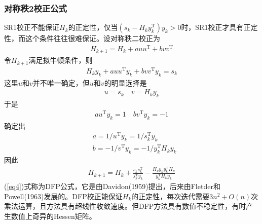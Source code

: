         \subsubsection{对称秩2校正公式}
            SR1校正不能保证$H_k$的正定性，仅当$(s_k-H_ky_k^\mathrm{T} )y_k>0$时，SR1校正才具有正定性，而这个条件往往很难保证。设对称秩二校正为
            \begin{align*}
             H_{k+1} = H_k+auu^\mathrm{T} +bvv^\mathrm{T}
            \end{align*}
            令$H_{k+1}$满足拟牛顿条件，则
            \begin{align*}
             H_{k}y_k +auu^\mathrm{T} y_k+bvv^\mathrm{T} y_k=s_k
            \end{align*}
            这里$u$和$v$并不唯一确定，但$u$和$v$的明显选择是
            \begin{align*}
             u=s_k\quad v=H_ky_k
            \end{align*}
            于是
            \begin{align*}
             au^\mathrm{T} y_k=1\quad bv^\mathrm{T} y_k=-1
            \end{align*}
            确定出
            \begin{align*}
             & a=1/{u^\mathrm{T} y_k}=1/{s_k^\mathrm{T} y_k}\\
             & b=-1/{v^\mathrm{T} y_k}=-1/{y_k^\mathrm{T} H_ky_k}
            \end{align*}
            因此
            \begin{align}
            \label{eq4}
             H_{k+1}=H_k+\frac {s_ks_k^\mathrm{T} }{s_k^\mathrm{T} y_k}-\frac {H_ky_ky_k^\mathrm{T} H_k}{y_k^\mathrm{T} H_ky_k}
            \end{align}
            (\ref{eq4})式称为DFP公式，它是由Davidon(1959)提出，后来由Fletder和Powell(1963)发展的。DFP校正能保证$H_k$的正定性，每次迭代需要$3n^2+O(n)$次乘法运算，且方法具有超线性收敛速度。但DFP方法具有数值不稳定性，有时产生数值上奇异的Hessen矩阵。
